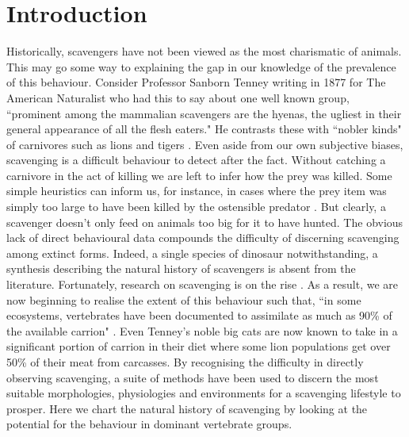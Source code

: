 \documentclass[a4paper,12pt]{article}
\begin{document}
\section*{Introduction}
Historically, scavengers have not been viewed as the most charismatic of animals.
This may go some way to explaining the gap in our knowledge of the prevalence of this behaviour.
Consider Professor Sanborn Tenney writing in 1877 for The American Naturalist who had this to say about one well known group, ``prominent among the mammalian scavengers are the hyenas, the ugliest in their general appearance of all the flesh eaters."
He contrasts these with ``nobler kinds" of carnivores such as lions and tigers \citep{tenney1877few}.
Even aside from our own subjective biases, scavenging is a difficult behaviour to detect after the fact.
Without catching a carnivore in the act of killing we are left to infer how the prey was killed.
Some simple heuristics can inform us, for instance, in cases where the prey item was simply too large to have been killed by the ostensible predator \citep{pobiner2008paleoecological}.
But clearly, a scavenger doesn’t only feed on animals too big for it to have hunted.
The obvious lack of direct behavioural data compounds the difficulty of discerning scavenging among extinct forms.
Indeed, a single species of dinosaur notwithstanding, a synthesis describing the natural history of scavengers is absent from the literature.
Fortunately, research on scavenging is on the rise \citep{manga2006vulture}.
As a result, we are now beginning to realise the extent of this behaviour such that, ``in some ecosystems, vertebrates have been documented to assimilate as much as 90\% of the available carrion" \citep{beasley2015vertebrates}.
Even Tenney’s noble big cats are now known to take in a significant portion of carrion in their diet where some lion populations get over 50\% of their meat from carcasses.
By recognising the difficulty in directly observing scavenging, a suite of methods have been used to discern the most suitable morphologies, physiologies and environments for a scavenging lifestyle to prosper.
Here we chart the natural history of scavenging by looking at the potential for the behaviour in dominant vertebrate groups.
\end{document}
